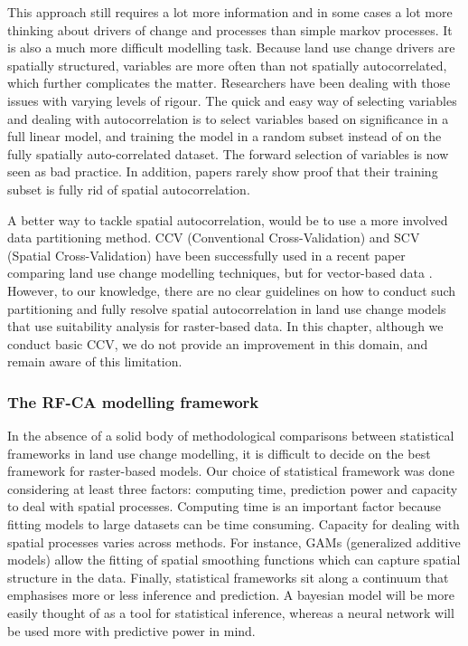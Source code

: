 This approach still requires a lot more information and in some cases a lot more thinking about drivers of change and processes than simple markov processes. It is also a much more difficult modelling task. Because land use change drivers are spatially structured, variables are more often than not spatially autocorrelated, which further complicates the matter. Researchers have been dealing with those issues with varying levels of rigour. The quick and easy way of selecting variables and dealing with autocorrelation is to select variables based on significance in a full linear model, and training the model in a random subset instead of on the fully spatially auto-correlated dataset. The forward selection of variables is now seen as bad practice. In addition, papers rarely show proof that their training subset is fully rid of spatial autocorrelation.

A better way to tackle spatial autocorrelation, would be to use a more involved data partitioning method. CCV (Conventional Cross-Validation) and SCV (Spatial Cross-Validation) have been successfully used in a recent paper comparing land use change modelling techniques, but for vector-based data \citep{sun_comparison_2018}. However, to our knowledge, there are no clear guidelines on how to conduct such partitioning and fully resolve spatial autocorrelation in land use change models that use suitability analysis for raster-based data. In this chapter, although we conduct basic CCV, we do not provide an improvement in this domain, and remain aware of this limitation.\\

\subsubsection{The RF-CA modelling framework}

In the absence of a solid body of methodological comparisons between statistical frameworks in land use change modelling, it is difficult to decide on the best framework for raster-based models. Our choice of statistical framework was done considering at least three factors: computing time, prediction power and capacity to deal with spatial processes. Computing time is an important factor because fitting models to large datasets can be time consuming. Capacity for dealing with spatial processes varies across methods. For instance, GAMs (generalized additive models) allow the fitting of spatial smoothing functions which can capture spatial structure in the data. Finally, statistical frameworks sit along a continuum that emphasises more or less inference and prediction. A bayesian model will be more easily thought of as a tool for statistical inference, whereas a neural network will be used more with predictive power in mind.

